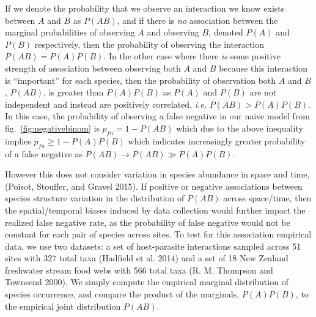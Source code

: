 \documentclass[11pt]{article}
\begin{document}
If we denote the probability that we observe an interaction we know
exists between \(A\) and \(B\) as \(P(AB)\), and if there is \emph{no}
association between the marginal probabilities of observing \(A\) and
observing \(B\), denoted \(P(A)\) and \(P(B)\) respectively, then the
probability of observing the interaction \(P(AB) = P(A)P(B)\). In the
other case where there \emph{is} some positive strength of association
between observing both \(A\) and \(B\) because this interaction is
``important'' for each species, then the probability of observation both
\(A\) and \(B\), \(P(AB)\), is greater than \(P(A)P(B)\) as \(P(A)\) and
\(P(B)\) are not independent and instead are positively correlated,
\emph{i.e.} \(P(AB) > P(A)P(B)\). In this case, the probability of
observing a false negative in our naive model from
fig.~\ref{fig:negativebinom} is \(p_{fn} = 1 - P(AB)\) which due to the
above inequality implies \(p_{fn} \geq 1 - P(A)P(B)\) which indicates
increasingly greater probability of a false negative as
\(P(AB) \to P(AB) \gg P(A)P(B)\).

However this does not consider variation in species abundance in space
and time, (Poisot, Stouffer, and Gravel 2015). If positive or negative
associations between species structure variation in the distribution of
\(P(AB)\) across space/time, then the spatial/temporal biases induced by
data collection would further impact the realized false negative rate,
as the probability of false negative would not be constant for each pair
of species across sites. To test for this association empirical data, we
use two datasets: a set of host-parasite interactions sampled across 51
sites with 327 total taxa (Hadfield et al. 2014) and a set of 18 New
Zealand freshwater stream food webs with 566 total taxa (R. M. Thompson
and Townsend 2000). We simply compute the empirical marginal
distribution of species occurrence, and compare the product of the
marginals, \(P(A)P(B)\), to the empirical joint distribution \(P(AB)\).
\end{document}
